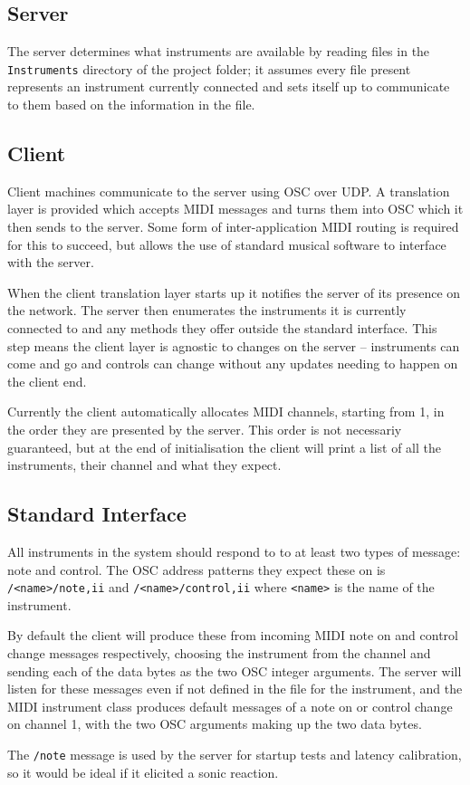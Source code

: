 \documentclass[../main.tex]{subfiles}
\begin{document}
\subsection{Server}
The server determines what instruments are available by reading files in the \texttt{Instruments} directory of the project folder; it assumes every file present represents an instrument
currently connected and sets itself up to communicate to them based on the information in the file.

\subsection{Client}
Client machines communicate to the server using OSC over UDP. A translation layer is provided which accepts MIDI messages and turns them into OSC which it then sends to the 
server. Some form of inter-application MIDI routing is required for this to succeed, but allows the use of standard musical software to interface with the server. 

When the client translation layer starts up it notifies the server of its presence on the network. The server then enumerates the instruments it is currently connected to and any methods
they offer outside the standard interface. This step means the client layer is agnostic to changes on the server -- instruments can come and go and controls can change without any
updates needing to happen on the client end.

Currently the client automatically allocates MIDI channels, starting from 1, in the order they are presented by the server.
This order is not necessariy guaranteed, but at the end of initialisation the client will print a list of all the instruments,
their channel and what they expect.

\subsection{Standard Interface}
All instruments in the system should respond to to at least two types of message: note and control. The OSC address
patterns they expect these on is \texttt{/<name>/note,ii} and \texttt{/<name>/control,ii} where \texttt{<name>} is the name
of the instrument. 

By default the client will produce these from incoming MIDI note on and control change messages 
respectively, choosing the instrument from the channel and sending each of the data bytes as the two OSC integer 
arguments. The server will listen for these messages even if not defined in the file for the instrument, and the MIDI 
instrument class produces default messages of a note on or control change on channel 1, with the two OSC arguments 
making up the two data bytes. 

The \texttt{/note} message is used by the server for startup tests and latency calibration, so it would be ideal if it elicited a sonic reaction. 
\end{document}
